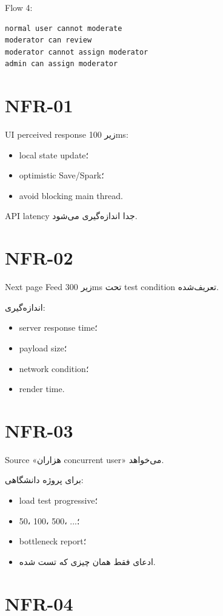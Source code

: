 Flow 4:
\begin{latin}
\begin{lstlisting}
normal user cannot moderate
moderator can review
moderator cannot assign moderator
admin can assign moderator
\end{lstlisting}
\end{latin}

\section{NFR-01}

UI perceived response زیر 100ms:
\begin{itemize}
  \item local state update؛
  \item optimistic Save/Spark؛
  \item avoid blocking main thread.
\end{itemize}

API latency جدا اندازه‌گیری می‌شود.

\section{NFR-02}

Next page Feed زیر 300ms تحت test condition تعریف‌شده.

اندازه‌گیری:
\begin{itemize}
  \item server response time؛
  \item payload size؛
  \item network condition؛
  \item render time.
\end{itemize}

\section{NFR-03}

Source «هزاران concurrent user» می‌خواهد.

برای پروژه دانشگاهی:
\begin{itemize}
  \item load test progressive؛
  \item 50، 100، 500، ...؛
  \item bottleneck report؛
  \item ادعای فقط همان چیزی که تست شده.
\end{itemize}

\section{NFR-04}

